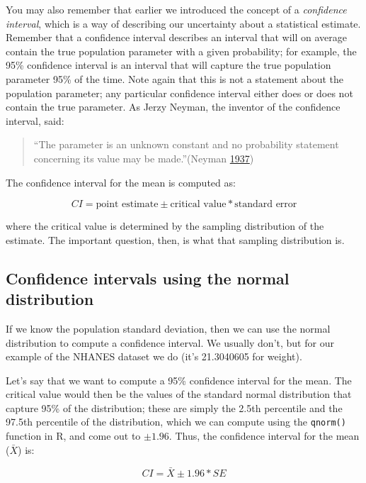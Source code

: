 \documentclass[12pt,]{book}
\begin{document}
You may also remember that earlier we introduced the concept of a \emph{confidence interval}, which is a way of describing our uncertainty about a statistical estimate. Remember that a confidence interval describes an interval that will on average contain the true population parameter with a given probability; for example, the 95\% confidence interval is an interval that will capture the true population parameter 95\% of the time. Note again that this is not a statement about the population parameter; any particular confidence interval either does or does not contain the true parameter. As Jerzy Neyman, the inventor of the confidence interval, said:

\begin{quote}
``The parameter is an unknown constant and no probability statement concerning its value may be made.''(Neyman \protect\hyperlink{ref-Neyman37}{1937})
\end{quote}

The confidence interval for the mean is computed as:

\[
CI = \text{point estimate} \pm \text{critical value} * \text{standard error}
\]

where the critical value is determined by the sampling distribution of the estimate. The important question, then, is what that sampling distribution is.

\hypertarget{confidence-intervals-using-the-normal-distribution}{%
\subsection{Confidence intervals using the normal distribution}\label{confidence-intervals-using-the-normal-distribution}}

If we know the population standard deviation, then we can use the normal distribution to compute a confidence interval. We usually don't, but for our example of the NHANES dataset we do (it's 21.3040605 for weight).

Let's say that we want to compute a 95\% confidence interval for the mean. The critical value would then be the values of the standard normal distribution that capture 95\% of the distribution; these are simply the 2.5th percentile and the 97.5th percentile of the distribution, which we can compute using the \texttt{qnorm()} function in R, and come out to \(\pm 1.96\). Thus, the confidence interval for the mean (\(\bar{X}\)) is:

\[
CI = \bar{X} \pm 1.96*SE
\]
\end{document}
